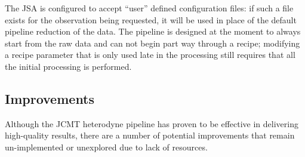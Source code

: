 \documentclass[a4paper,fleqn,usenatbib]{mnras}
\begin{document}
The JSA is configured to accept ``user'' defined configuration files: if such
a file exists for the observation being requested, it will be used in place of the default
pipeline reduction of the data. The pipeline is designed at the moment
to always start from the raw data and can not begin part way through a
recipe; modifying a recipe parameter that is only used late in the
processing still requires that all the initial processing is performed.

\subsection{Improvements}

Although the JCMT heterodyne pipeline has proven to be effective in delivering
high-quality results, there are a number of potential improvements that remain
un-implemented or unexplored due to lack of resources.
\end{document}
